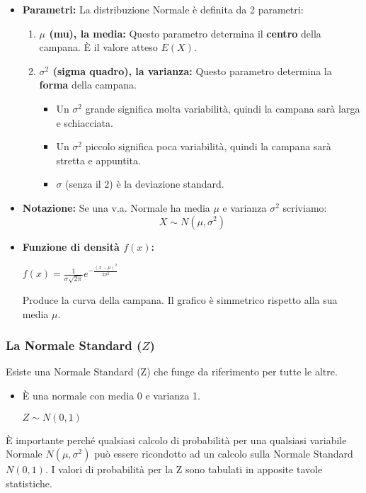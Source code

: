 \documentclass[a4paper, 11pt]{article}
\theoremstyle{definition}
\begin{document}
\begin{itemize}
    \item \textbf{Parametri:} La distribuzione Normale è definita da 2 parametri:
    \begin{enumerate}
        \item \textbf{$\mu$ (mu), la media:} Questo parametro determina il \textbf{centro} della campana. È il valore atteso $E(X)$.
        \item \textbf{$\sigma^2$ (sigma quadro), la varianza:} Questo parametro determina la \textbf{forma} della campana.
        \begin{itemize}
            \item Un $\sigma^2$ grande significa molta variabilità, quindi la campana sarà larga e schiacciata.
            \item Un $\sigma^2$ piccolo significa poca variabilità, quindi la campana sarà stretta e appuntita.
            \item $\sigma$ (senza il 2) è la deviazione standard.
        \end{itemize}
    \end{enumerate}

    \item \textbf{Notazione:} Se una v.a. Normale ha media $\mu$ e varianza $\sigma^2$ scriviamo:
    \[ X \sim N(\mu, \sigma^2) \]

    \item \textbf{Funzione di densità $f(x)$:}
    \begin{formulabox}
        $f(x) = \frac{1}{\sigma \sqrt{2\pi}} e^{-\frac{(x-\mu)^2}{2\sigma^2}}$
    \end{formulabox}
    Produce la curva della campana. Il grafico è simmetrico rispetto alla sua media $\mu$.
\end{itemize}

\newpage

\subsubsection{La Normale Standard ($Z$)}
Esiste una Normale Standard (Z) che funge da riferimento per tutte le altre.
\begin{itemize}
    \item È una normale con media 0 e varianza 1.
    \begin{formulabox}
        $Z \sim N(0, 1)$
    \end{formulabox}
\end{itemize}
È importante perché qualsiasi calcolo di probabilità per una qualsiasi variabile Normale $N(\mu, \sigma^2)$ può essere ricondotto ad un calcolo sulla Normale Standard $N(0, 1)$. I valori di probabilità per la Z sono tabulati in apposite tavole statistiche.
\end{document}
